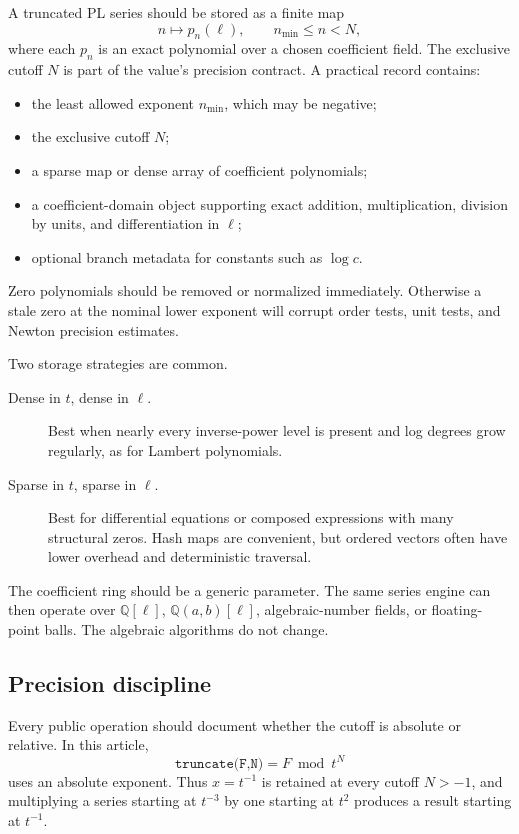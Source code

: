 \documentclass[11pt,oneside]{article}
\numberwithin{equation}{section}
\theoremstyle{definition}
\newcommand{\Q}{\mathbb Q}
\begin{document}
A truncated PL series should be stored as a finite map
\begin{equation}\label{eq:data-model}
  n\longmapsto p_n(\ell),
  \qquad n_{\min}\le n<N,
\end{equation}
where each \(p_n\) is an exact polynomial over a chosen coefficient field.  The
exclusive cutoff \(N\) is part of the value's precision contract.  A practical
record contains:
\begin{itemize}
\item the least allowed exponent \(n_{\min}\), which may be negative;
\item the exclusive cutoff \(N\);
\item a sparse map or dense array of coefficient polynomials;
\item a coefficient-domain object supporting exact addition, multiplication,
  division by units, and differentiation in \(\ell\);
\item optional branch metadata for constants such as \(\log c\).
\end{itemize}
Zero polynomials should be removed or normalized immediately.  Otherwise a
stale zero at the nominal lower exponent will corrupt order tests, unit tests,
and Newton precision estimates.

Two storage strategies are common.

\begin{description}
\item[Dense in \(t\), dense in \(\ell\).]
Best when nearly every inverse-power level is present and log degrees grow
regularly, as for Lambert polynomials.
\item[Sparse in \(t\), sparse in \(\ell\).]
Best for differential equations or composed expressions with many structural
zeros.  Hash maps are convenient, but ordered vectors often have lower overhead
and deterministic traversal.
\end{description}

The coefficient ring should be a generic parameter.  The same series engine can
then operate over \(\Q[\ell]\), \(\Q(a,b)[\ell]\), algebraic-number fields, or
floating-point balls.  The algebraic algorithms do not change.

\subsection{Precision discipline}

Every public operation should document whether the cutoff is absolute or
relative.  In this article,
\[
  \texttt{truncate(F,N)}=F\bmod t^N
\]
uses an absolute exponent.  Thus \(x=t^{-1}\) is retained at every cutoff
\(N>-1\), and multiplying a series starting at \(t^{-3}\) by one starting at
\(t^2\) produces a result starting at \(t^{-1}\).
\end{document}
